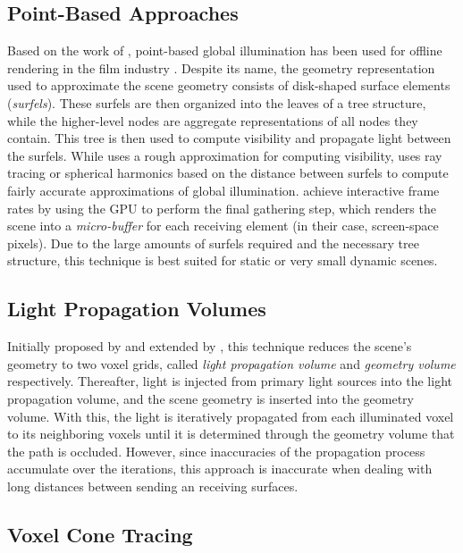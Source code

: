 \subsection{Point-Based Approaches}

Based on the work of \citet{Bunnell:2005:AO}, point-based global illumination has been used for offline rendering in the film industry \citep{christensen2008point}.
Despite its name, the geometry representation used to approximate the scene geometry consists of disk-shaped surface elements (\emph{surfels}).
These surfels are then organized into the leaves of a tree structure, while the higher-level nodes are aggregate representations of all nodes they contain.
This tree is then used to compute visibility and propagate light between the surfels.
While \citet{Bunnell:2005:AO} uses a rough approximation for computing visibility, \citet{christensen2008point} uses ray tracing or spherical harmonics based on the distance between surfels to compute fairly accurate approximations of global illumination.
\citet{Ritschel:2009:microrendering} achieve interactive frame rates by using the GPU to perform the final gathering step, which renders the scene into a \emph{micro-buffer} for each receiving element (in their case, screen-space pixels).
Due to the large amounts of surfels required and the necessary tree structure, this technique is best suited for static or very small dynamic scenes.



\subsection{Light Propagation Volumes}
\label{sec:intro:gi:previousWork:lpv}

Initially proposed by \citet{Kaplanyan:2010:LPV} and extended by \citet{Kaplanyan:2010:LPV2}, this technique reduces the scene's geometry to two voxel grids, called \emph{light propagation volume} and \emph{geometry volume} respectively. Thereafter, light is injected from primary light sources into the light propagation volume, and the scene geometry is inserted into the geometry volume. With this, the light is iteratively propagated from each illuminated voxel to its neighboring voxels until it is determined through the geometry volume that the path is occluded. However, since inaccuracies of the propagation process accumulate over the iterations, this approach is inaccurate when dealing with long distances between sending an receiving surfaces.


\subsection{Voxel Cone Tracing}

